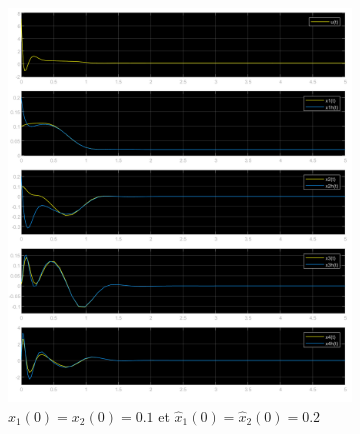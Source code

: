 \documentclass[class=article, crop=false]{standalone}
\begin{document}
\begin{resolution}
    \begin{figure}[H]
        \centering
        \begin{subfigure}[b]{0.475\textwidth}
            \centering
            \includegraphics[width=\textwidth]{../images/m5_r0.02_s0.1_o0.2.png}
            \caption{$x_1(0) = x_2(0) = 0.1$ et $\hat{x}_1(0) = \hat{x}_2(0) = 0.2$}
        \end{subfigure}
        \begin{subfigure}[b]{0.475\textwidth}
            \centering

\end{subfigure}
\end{figure}
\end{resolution}
\end{document}
